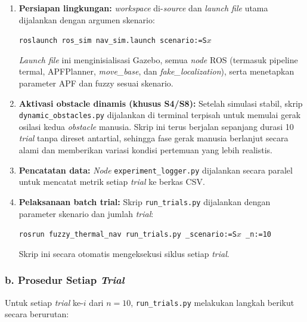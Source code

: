 \begin{enumerate}
    \item \textbf{Persiapan lingkungan:} \textit{workspace} di-\textit{source} dan \textit{launch file} utama dijalankan dengan argumen skenario:
    \begin{center}
    \texttt{roslaunch ros\_sim nav\_sim.launch scenario:=S$x$}
    \end{center}
    \textit{Launch file} ini menginisialisasi Gazebo, semua \textit{node} ROS (termasuk pipeline termal, APFPlanner, \textit{move\_base}, dan \textit{fake\_localization}), serta menetapkan parameter APF dan fuzzy sesuai skenario.

    \item \textbf{Aktivasi obstacle dinamis (khusus S4/S8):} Setelah simulasi stabil, skrip \texttt{dynamic\_obstacles.py} dijalankan di terminal terpisah untuk memulai gerak osilasi kedua \textit{obstacle} manusia. Skrip ini terus berjalan sepanjang durasi 10 \textit{trial} tanpa direset antartial, sehingga fase gerak manusia berlanjut secara alami dan memberikan variasi kondisi pertemuan yang lebih realistis.

    \item \textbf{Pencatatan data:} \textit{Node} \texttt{experiment\_logger.py} dijalankan secara paralel untuk mencatat metrik setiap \textit{trial} ke berkas CSV.

    \item \textbf{Pelaksanaan batch trial:} Skrip \texttt{run\_trials.py} dijalankan dengan parameter skenario dan jumlah \textit{trial}:
    \begin{center}
    \texttt{rosrun fuzzy\_thermal\_nav run\_trials.py \_scenario:=S$x$ \_n:=10}
    \end{center}
    Skrip ini secara otomatis mengeksekusi siklus setiap \textit{trial}.
\end{enumerate}

\subsubsection*{b. Prosedur Setiap \textit{Trial}}

Untuk setiap \textit{trial} ke-$i$ dari $n = 10$, \texttt{run\_trials.py} melakukan langkah berikut secara berurutan:

